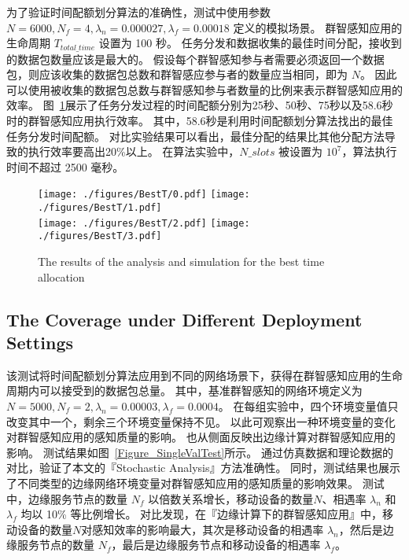 为了验证时间配额划分算法的准确性，测试中使用参数 $N=6000, N_f=4, \lambda_n = 0.000027, \lambda_f=0.00018$ 定义的模拟场景。
群智感知应用的生命周期 $T_{total\_time}$ 设置为 100 秒。
任务分发和数据收集的最佳时间分配，接收到的数据包数量应该是最大的。
假设每个群智感知参与者需要必须返回一个数据包，则应该收集的数据包总数和群智感应参与者的数量应当相同，即为 $N$。
因此可以使用被收集的数据包总数与群智感知参与者数量的比例来表示群智感知应用的效率。
图~\ref{Figure_BestT}展示了任务分发过程的时间配额分别为25秒、50秒、75秒以及58.6秒时的群智感知应用执行效率。
其中，58.6秒是利用时间配额划分算法找出的最佳任务分发时间配额。
对比实验结果可以看出，最佳分配的结果比其他分配方法导致的执行效率要高出20\%以上。
在算法实验中，$N\_slots$ 被设置为 $10^7$，算法执行时间不超过 2500 毫秒。

\begin{figure}[!h]
  \centering
  {\texttt{[image: ./figures/BestT/0.pdf]}}
  {\texttt{[image: ./figures/BestT/1.pdf]}}\\
  {\texttt{[image: ./figures/BestT/2.pdf]}}
  {\texttt{[image: ./figures/BestT/3.pdf]}}
  \vspace{-1em}
  \caption{The results of the analysis and simulation for the best time allocation}
  \label{Figure_BestT}
\end{figure}

\subsection{The Coverage under Different Deployment Settings}

该测试将时间配额划分算法应用到不同的网络场景下，获得在群智感知应用的生命周期内可以接受到的数据包总量。
其中，基准群智感知的网络环境定义为 $N=5000, N_f=2, \lambda_n = 0.00003, \lambda_f=0.0004$。
在每组实验中，四个环境变量值只改变其中一个，剩余三个环境变量保持不见。
以此可观察出一种环境变量的变化对群智感知应用的感知质量的影响。
也从侧面反映出边缘计算对群智感知应用的影响。
测试结果如图~\ref{Figure_SingleValTest}所示。
通过仿真数据和理论数据的对比，验证了本文的『Stochastic Analysis』方法准确性。
同时，测试结果也展示了不同类型的边缘网络环境变量对群智感知应用的感知质量的影响效果。
测试中，边缘服务节点的数量 $N_f$ 以倍数关系增长，移动设备的数量$N$、相遇率 $\lambda_n$ 和 $\lambda_f$ 均以 10\% 等比例增长。
对比发现，在『边缘计算下的群智感知应用』中，移动设备的数量$N$对感知效率的影响最大，其次是移动设备的相遇率 $\lambda_n$，然后是边缘服务节点的数量 $N_f$，最后是边缘服务节点和移动设备的相遇率 $\lambda_f$。


